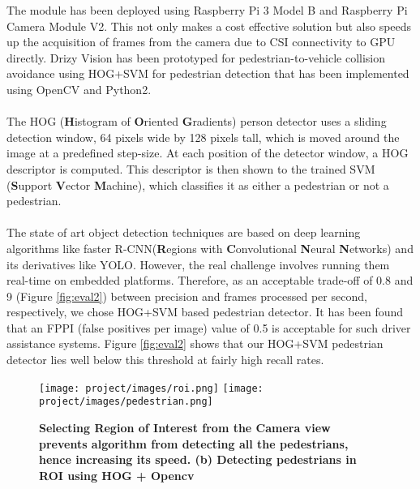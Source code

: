 The module has been deployed using Raspberry Pi 3 Model B and Raspberry Pi Camera Module V2. This not only makes a cost effective solution but also speeds up the acquisition of frames from the camera due to CSI connectivity to GPU directly.  Drizy Vision has been prototyped for pedestrian-to-vehicle collision avoidance using HOG+SVM \cite{dalal2005histograms} for pedestrian detection that has been implemented using OpenCV and Python2.
\paragraph{}The HOG (\textbf{H}istogram of \textbf{O}riented \textbf{G}radients)  person detector uses a sliding detection window, 64 pixels wide by 128 pixels tall, which is moved around the image at a predefined step-size. At each position of the detector window, a HOG descriptor is computed. This descriptor is then shown to the trained SVM (\textbf{S}upport \textbf{V}ector \textbf{M}achine), which classifies it as either a pedestrian or not a pedestrian. 
\paragraph{}The state of art object detection techniques are based on deep learning algorithms like faster R-CNN\cite{ren2015faster}(\textbf{R}egions with \textbf{C}onvolutional \textbf{N}eural \textbf{N}etworks) and its derivatives like YOLO\cite{redmon2016you}. However, the real challenge involves running them real-time on embedded platforms. Therefore, as an acceptable trade-off of 0.8 and 9 (Figure \ref{fig:eval2}) between precision and frames processed per second, respectively, we chose HOG+SVM based pedestrian detector. It has been found that an FPPI (false positives per image) value of 0.5 is acceptable for such driver assistance systems. Figure \ref{fig:eval2} shows that our HOG+SVM pedestrian detector lies well below this threshold at fairly high recall rates.

\begin{figure}[hbtp]
  \centering
  \texttt{[image: project/images/roi.png]}
    \texttt{[image: project/images/pedestrian.png]}
  \caption{\textbf{Selecting Region of Interest from the Camera view prevents algorithm from detecting all the pedestrians, hence increasing its speed. (b) Detecting pedestrians in ROI using HOG + Opencv}}
\end{figure}
